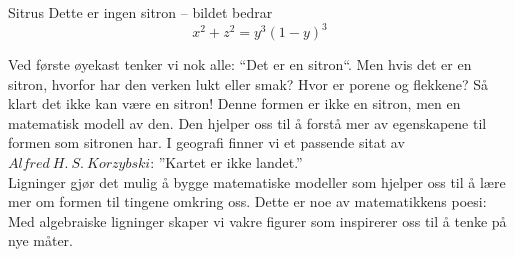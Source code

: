 \begin{surferPage}{Sitrus}
Dette er ingen sitron – bildet bedrar\\
\smallskip
\[x^2 + z^2 = y^3 (1 - y)^3\] 


\singlespacing
Ved første øyekast tenker vi nok alle: ``Det er en sitron``. Men hvis det er en sitron, hvorfor har den verken lukt eller smak? Hvor er porene og flekkene? Så klart det ikke kan være en sitron! 
\singlespacing
Denne formen er ikke en sitron, men en matematisk modell av den. Den hjelper oss til å forstå mer av egenskapene til formen som sitronen har. I geografi finner vi et passende sitat av $Alfred\ H.\ S.\ Korzybski$: ''Kartet er ikke landet.'' \\
\singlespacing
Ligninger gjør det mulig å bygge matematiske modeller som hjelper oss til å lære mer om formen til tingene omkring oss. 
\singlespacing
Dette er noe av matematikkens poesi: Med algebraiske ligninger skaper vi vakre figurer som inspirerer oss til å tenke på nye måter.
\end{surferPage}
